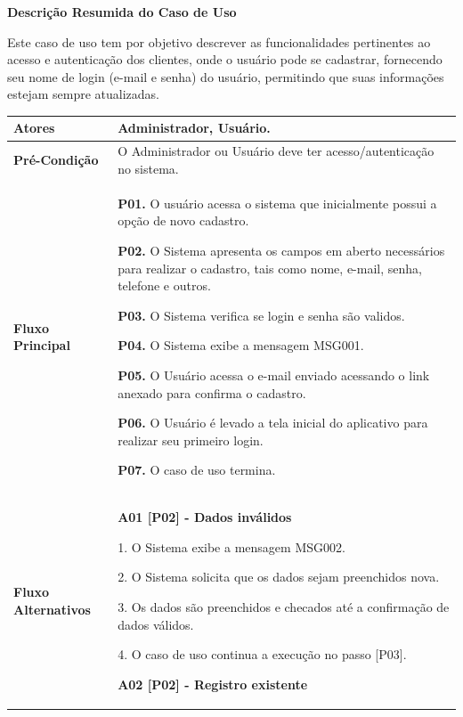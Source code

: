        \textbf {Descrição Resumida do Caso de Uso} 
       
        Este caso de uso tem por objetivo descrever as funcionalidades pertinentes ao acesso e autenticação dos clientes, onde o usuário pode se cadastrar, fornecendo seu nome de login (e-mail e senha) do usuário, permitindo que suas informações estejam sempre atualizadas.

\begin{quadro}[!htbp]
	\begin{tabular}{  m{4cm}  m{11cm} }
		\cellcolor{gray!10}\textbf {Atores}                & \cellcolor{gray!10} Administrador, Usuário.  \\ \hline
        \textbf {Pré-Condição}          & O Administrador ou Usuário deve ter acesso/autenticação no sistema.  \\ \hline
       
        \cellcolor{gray!10}\textbf {Fluxo Principal}       & \cellcolor{gray!10}\textbf {P01.} O usuário acessa o sistema que inicialmente possui a opção de novo cadastro.
        
        \textbf {P02.} O Sistema apresenta os campos em aberto necessários para realizar o cadastro, tais como nome, e-mail, senha, telefone e outros.
        
        \textbf {P03.} O Sistema verifica se login e senha são validos.
        
        \textbf {P04.} O Sistema exibe a mensagem MSG001.
        
        \textbf {P05.} O Usuário acessa o e-mail enviado acessando o link anexado para confirma o cadastro.
        
        \textbf {P06.} O Usuário é levado a tela inicial do aplicativo para realizar seu primeiro login.
        
        \textbf {P07.} O caso de uso termina. \\ \hline

        \textbf {Fluxo  Alternativos}  & \textbf {A01 [P02] - Dados inválidos}
  
        1. O Sistema exibe a mensagem MSG002.
        
        2. O Sistema solicita que os dados sejam preenchidos nova.
        
        3. Os dados são preenchidos e checados até a confirmação de dados válidos.
        
        4. O caso de uso continua a execução no passo [P03].
        
        \textbf {A02 [P02] - Registro existente}
        

\end{tabular}
\end{quadro}
